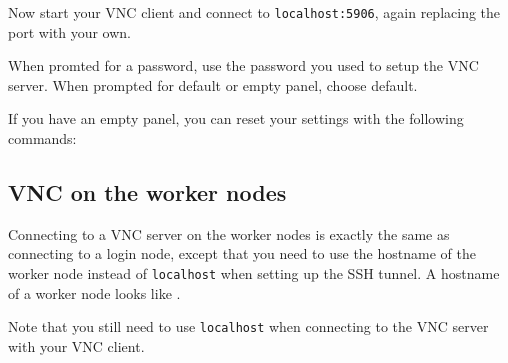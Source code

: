 Now start your VNC client and connect to \lstinline|localhost:5906|, again replacing
the port with your own.

When promted for a password, use the password you used to setup the VNC server.
When prompted for default or empty panel, choose default.

If you have an empty panel, you can reset your settings with the following commands:

\begin{prompt}
\end{prompt}

\subsection{VNC on the worker nodes}

Connecting to a VNC server on the worker nodes is exactly the same as connecting
to a login node, except that you need to use the hostname of the worker node instead of
\lstinline|localhost| when setting up the SSH tunnel. A hostname of a worker node looks like
\texttt{\computenode{}}.

Note that you still need to use \lstinline|localhost| when connecting to the VNC server
with your VNC client.
